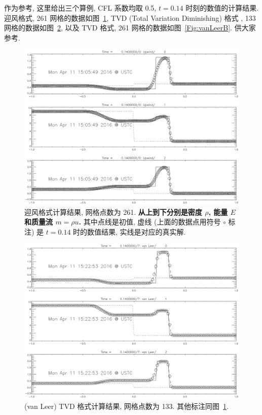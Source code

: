 \documentclass[10.5pt
]{article}
\begin{document}
作为参考, 这里给出三个算例, CFL 系数均取 0.5, $t=0.14$ 时刻的数值的计算结果. 迎风格式, 261 网格的数据如图~\ref{Fig:Upwind},
TVD (Total Variation Diminishing) 格式 \citep{vanLeer1974,Harten1983}, 133 网格的数据如图~\ref{Fig:vanLeerA}, 以及 TVD 格式, 261
网格的数据如图~\ref{Fig:vanLeerB}. 供大家参考.

\begin{figure}
\begin{center}
\includegraphics[width=.85\textwidth]{GasUpwind261.eps}
\caption{迎风格式计算结果, 网格点数为 261. \textbf{从上到下分别是密度 $\rho$, 能量 $E$ 和质量流 $m = \rho u$.}
其中点线是初值, 虚线 (上面的数据点用符号 $\circ$ 标注) 是 $t=0.14$ 时的数值结果, 实线是对应的真实解.}\label{Fig:Upwind}
\end{center}
\end{figure}

\begin{figure}
\begin{center}
\includegraphics[width=.85\textwidth]{GasvanLeer133.eps}
\caption{(van Leer) TVD 格式计算结果, 网格点数为 133. 其他标注同图~\ref{Fig:Upwind}.}\label{Fig:vanLeerA}
\end{center}
\end{figure}
\end{document}

